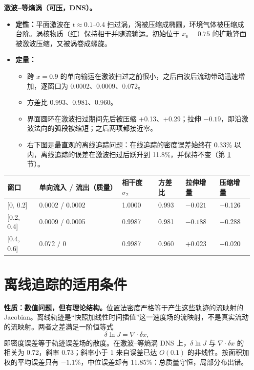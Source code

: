 \documentclass[10.5pt,a4paper]{article}
\begin{document}
\textbf{激波–等熵涡（可压，DNS）。}
\begin{itemize}
\item \textbf{定性：}平面激波在 $t\approx0.1$–0.4 扫过涡，涡被压缩成椭圆，环境气体被压缩成台阶。涡核物质（红）保持相干并随流输运。初始位于 $x_0=0.75$ 的扩散锋面被激波压缩，又被涡卷成螺旋。
\item \textbf{定量：}
\begin{itemize}
\item 跨 $x=0.9$ 的单向输运在激波扫过之前很小，之后由波后流动带动迅速增加，逐窗口为 0.0002、0.0009、0.072。
\item 方差比 0.993、0.981、0.960。
\item 界面圆环在激波扫过期间先后被压缩 +0.13、+0.29；拉伸 $-0.19$，即沿激波法向的弧段被缩短；之后两项都接近零。
\item 右下图是最直观的离线追踪问题：在线追踪的密度误差始终在 0.33\% 以内，离线追踪的误差在激波扫过后跃升到 11.8\%，并保持不变（第 \ref{sec:offline} 节）。
\end{itemize}
\end{itemize}
\begin{center}\small\begin{tabularx}{\linewidth}{@{}lYYYYY@{}}\toprule 窗口 & 单向流入 / 流出（质量） & 相干度 $\sigma_2$ & 方差比 & 拉伸增量 & 压缩增量 \\\midrule {[0, 0.2]} & 0.0002 / 0.0002 & 1.0000 & 0.993 & $-0.021$ & +0.126 \\ {[0.2, 0.4]} & 0.0009 / 0.0005 & 0.9987 & 0.981 & $-0.188$ & +0.288 \\ {[0.4, 0.6]} & 0.072 / 0 & 0.9987 & 0.960 & +0.023 & $-0.020$ \\ \bottomrule\end{tabularx}\end{center}

\section{离线追踪的适用条件}\label{sec:offline}
\textbf{性质：数值问题，但有理论结构。}位置法密度严格等于产生这些轨迹的流映射的 Jacobian。离线轨迹是“快照加线性时间插值”这一速度场的流映射，不是真实流动的流映射。两者之差满足一阶恒等式
\begin{equation}
\delta\ln J=\nabla\!\cdot\delta x ,
\end{equation}
即密度误差等于轨迹误差场的散度。在激波–等熵涡 DNS 上，$\delta\ln J$ 与 $\nabla\cdot\delta x$ 的相关为 0.72，斜率 0.73；斜率小于 1 来自误差已达 $O(0.1)$ 的非线性。按面积加权的平均误差只有 $-1.1\%$，中位误差却有 11.85\%：总质量守恒，局部分布出错。
\end{document}
